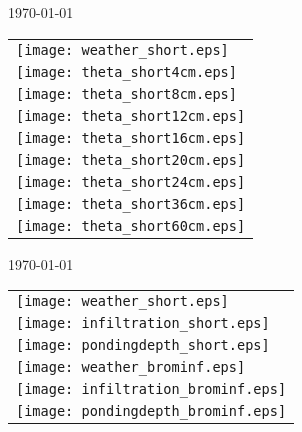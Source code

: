 \documentclass[a4paper]{article}
\begin{document}
\newpage
\today \\
%
\begin{tabular}{l}
\texttt{[image: weather\_short.eps]} \\
\texttt{[image: theta\_short4cm.eps]} \\
\texttt{[image: theta\_short8cm.eps]} \\
\texttt{[image: theta\_short12cm.eps]} \\
\texttt{[image: theta\_short16cm.eps]} \\
\texttt{[image: theta\_short20cm.eps]} \\
\texttt{[image: theta\_short24cm.eps]} \\
\texttt{[image: theta\_short36cm.eps]} \\
\texttt{[image: theta\_short60cm.eps]}
\end{tabular}

\newpage
\today \\
%
\begin{tabular}{l}
\texttt{[image: weather\_short.eps]} \\
\texttt{[image: infiltration\_short.eps]} \\
\texttt{[image: pondingdepth\_short.eps]} \\
\texttt{[image: weather\_brominf.eps]} \\
\texttt{[image: infiltration\_brominf.eps]} \\
\texttt{[image: pondingdepth\_brominf.eps]}
\end{tabular}
\end{document}
